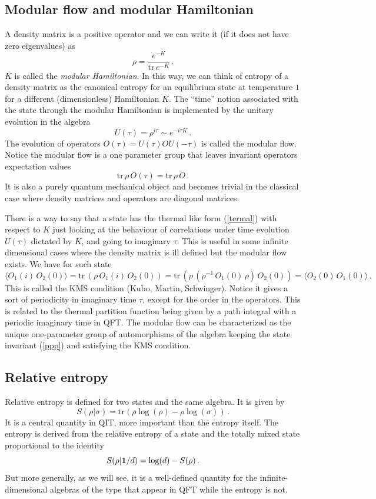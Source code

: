 \documentclass[11pt]{article}
\numberwithin{equation}{section}
\newcommand{\be}{\begin{equation}}
\newcommand{\ee}{\end{equation}}
\begin{document}
\subsection{Modular flow and modular Hamiltonian}

A density matrix is a positive operator and we can write it (if it does not have zero eigenvalues) as
\be
\rho= \frac{e^{-K}}{\textrm{tr}\,e^{-K}}\,. \label{termal}
\ee
$K$ is called the {\sl modular Hamiltonian}. In this way, we can think of entropy of a density matrix as the canonical entropy for an equilibrium state at temperature $1$ for a different (dimensionless) Hamiltonian $K$. The ``time'' notion associated with the state through the modular Hamiltonian is implemented by the unitary evolution in the algebra
\be
U(\tau)=\rho^{i \tau}\sim e^{-i \tau K}\,. \label{modflow}
\ee      
The evolution of operators $O(\tau)= U(\tau) O U(-\tau)$ is called the modular flow. Notice the modular flow is a one parameter group that leaves invariant operators expectation values
\be
\textrm{tr}\,\rho \, O(\tau)=\textrm{tr}\,\rho \, O\,.\label{ppp}
\ee
It is also a purely quantum mechanical object and becomes trivial in the classical case where density matrices and operators are diagonal matrices. 

There is a way to say that a state has the thermal like form (\ref{termal}) with respect to $K$ just looking at the behaviour of correlations under time evolution $U(\tau)$ dictated by $K$, and going to imaginary $\tau$. This is useful in some infinite dimensional cases where the density matrix is ill defined but the modular flow exists. We have for such state 
\be
\langle O_1(i)\,O_2(0)\rangle= \textrm{tr}\,(\rho\, O_1(i)\,O_2(0)) =\textrm{tr}\,(\rho\, (\rho^{-1}\,O_1(0)\,\rho)\,O_2(0)) =\langle O_2(0)\,O_1(0)\rangle\,. \label{kms}
\ee
This is called the KMS condition (Kubo, Martin, Schwinger). Notice it gives a sort of periodicity in imaginary time $\tau$, except for the order in the operators. 
 This is related to the thermal partition function being given by a path integral with a periodic imaginary time in QFT. The modular flow can be characterized as the unique one-parameter group of automorphisms of the algebra keeping the state invariant (\ref{ppp}) and satisfying the KMS condition.  

\subsection{Relative entropy}
Relative entropy is defined for two states and the same algebra. It is given by
\begin{equation}
S(\rho|\sigma) = \textrm{tr}( \rho \log (\rho)-\rho \log(\sigma))\,.
\end{equation}
It is a central quantity in QIT, more important than the entropy itself. The entropy is derived from the relative entropy of a state and the totally mixed state proportional to the identity
\be
S(\rho|{\bf 1}/d)=\log(d)-S(\rho)\,. 
\ee
But more generally, as we will see, it is a well-defined quantity for the infinite-dimensional algebras of the type that appear in QFT while the entropy is not.  
\end{document}
